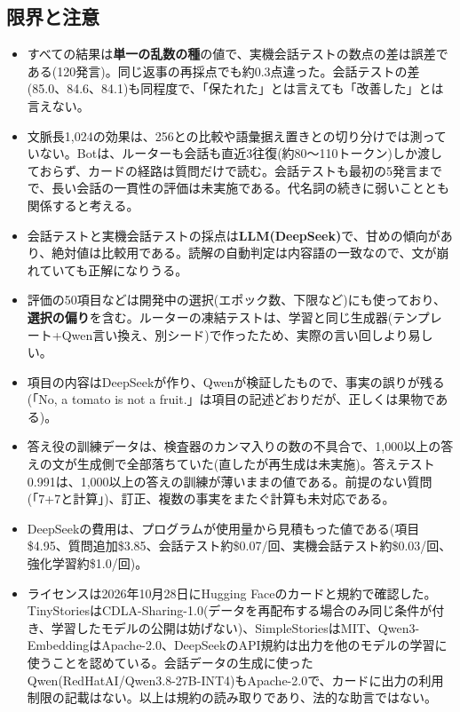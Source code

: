 \documentclass[a4paper,11pt]{article}
\begin{document}
\subsection{限界と注意}
\begin{itemize}
\item すべての結果は\textbf{単一の乱数の種}の値で、実機会話テストの数点の差は誤差である(120発言)。同じ返事の再採点でも約0.3点違った。会話テストの差(85.0、84.6、84.1)も同程度で、「保たれた」とは言えても「改善した」とは言えない。
\item 文脈長1,024の効果は、256との比較や語彙据え置きとの切り分けでは測っていない。Botは、ルーターも会話も直近3往復(約80〜110トークン)しか渡しておらず、カードの経路は質問だけで読む。会話テストも最初の5発言までで、長い会話の一貫性の評価は未実施である。代名詞の続きに弱いこととも関係すると考える。
\item 会話テストと実機会話テストの採点は\textbf{LLM(DeepSeek)}で、甘めの傾向があり、絶対値は比較用である。読解の自動判定は内容語の一致なので、文が崩れていても正解になりうる。
\item 評価の50項目などは開発中の選択(エポック数、下限など)にも使っており、\textbf{選択の偏り}を含む。ルーターの凍結テストは、学習と同じ生成器(テンプレート+Qwen言い換え、別シード)で作ったため、実際の言い回しより易しい。
\item 項目の内容はDeepSeekが作り、Qwenが検証したもので、事実の誤りが残る(「No, a tomato is not a fruit.」は項目の記述どおりだが、正しくは果物である)。
\item 答え役の訓練データは、検査器のカンマ入りの数の不具合で、1,000以上の答えの文が生成側で全部落ちていた(直したが再生成は未実施)。答えテスト0.991は、1,000以上の答えの訓練が薄いままの値である。前提のない質問(「7+7と計算」)、訂正、複数の事実をまたぐ計算も未対応である。
\item DeepSeekの費用は、プログラムが使用量から見積もった値である(項目\$4.95、質問追加\$3.85、会話テスト約\$0.07/回、実機会話テスト約\$0.03/回、強化学習約\$1.0/回)。
\item ライセンスは2026年10月28日にHugging Faceのカードと規約で確認した。TinyStoriesはCDLA-Sharing-1.0(データを再配布する場合のみ同じ条件が付き、学習したモデルの公開は妨げない)、SimpleStoriesはMIT、Qwen3-EmbeddingはApache-2.0、DeepSeekのAPI規約は出力を他のモデルの学習に使うことを認めている。会話データの生成に使ったQwen(RedHatAI/Qwen3.8-27B-INT4)もApache-2.0で、カードに出力の利用制限の記載はない。以上は規約の読み取りであり、法的な助言ではない。
\end{itemize}
\end{document}
